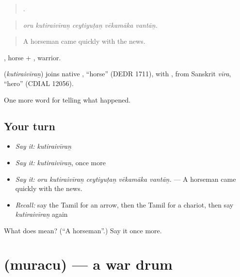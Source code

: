 \begin{quote}
    .
\end{quote}

\begin{quote}
\emph{oru kutiraivīraṉ ceytiyuṭaṉ vēkamāka vantāṉ.}
\end{quote}

\begin{quote}
A horseman came quickly with the news.
\end{quote}

, horse + , warrior.

\begin{cousinweb}
\textbf{} (\emph{kutiraivīraṉ}) joins native , \textquotedblleft{}horse\textquotedblright{} (DEDR 1711), with , from Sanskrit \emph{vīra}, \textquotedblleft{}hero\textquotedblright{} (CDIAL 12056).
\end{cousinweb}

\begin{grammarlens}[title={What you've built}]
One more word for telling what happened.
\end{grammarlens}

\subsection*{Your turn}
\begin{itemize}
\raggedright
  \item \emph{Say it:} \emph{kutiraivīraṉ}
  \item \emph{Say it:} \emph{kutiraivīraṉ}, once more
  \item \emph{Say it:} \emph{oru kutiraivīraṉ ceytiyuṭaṉ vēkamāka vantāṉ.} — A horseman came quickly with the news.
  \item \emph{Recall:} say the Tamil for an arrow, then the Tamil for a chariot, then say \emph{kutiraivīraṉ} again
\end{itemize}

\begin{tcolorbox}[breakable,colback=teal!4,colframe=teal!35!black,title={Before you move on}]
What does  mean? (\textquotedblleft{}A horseman\textquotedblright{}.) Say it once more.
\end{tcolorbox}
\section[\texorpdfstring{\ta{முரசு} (muracu)}{முரசு (muracu)}]{ (muracu) — a war drum}

